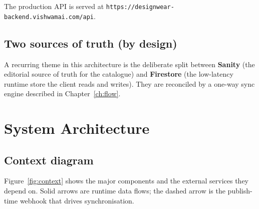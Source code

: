 \documentclass[11pt,a4paper]{report}
\newcommand{\code}[1]{\texttt{#1}}
\begin{document}
\noindent The production API is served at
\code{https://designwear-backend.vishwamai.com/api}.

\section{Two sources of truth (by design)}
A recurring theme in this architecture is the deliberate split between \textbf{Sanity}
(the editorial source of truth for the catalogue) and \textbf{Firestore} (the
low-latency runtime store the client reads and writes). They are reconciled by a
one-way sync engine described in Chapter~\ref{ch:flow}.

\chapter{System Architecture}\label{ch:sys}

\section{Context diagram}
Figure~\ref{fig:context} shows the major components and the external services they
depend on. Solid arrows are runtime data flows; the dashed arrow is the
publish-time webhook that drives synchronisation.
\end{document}
